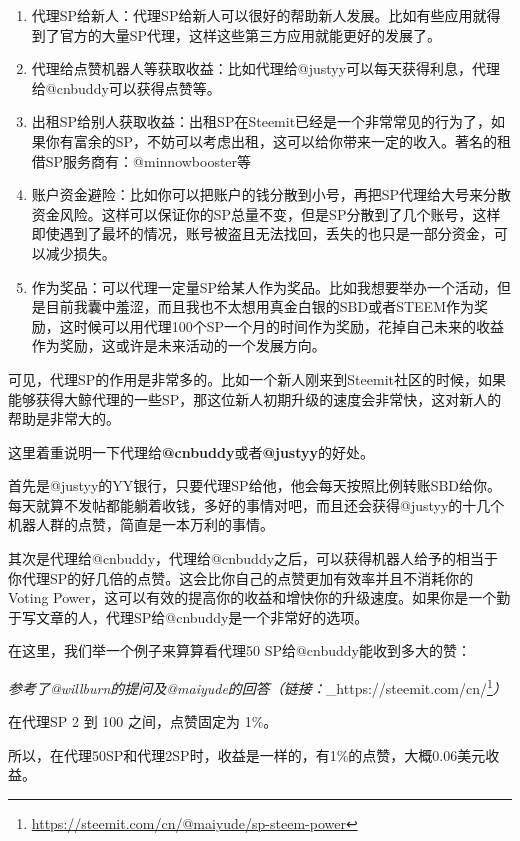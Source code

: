 \documentclass[]{ctexbook}
\providecommand{\tightlist}{%
  \setlength{\itemsep}{0pt}\setlength{\parskip}{0pt}}
\renewcommand{\href}[2]{#2\footnote{\url{#1}}}
\begin{document}
\begin{enumerate}
\def\labelenumi{\arabic{enumi}.}
\tightlist
\item
  代理SP给新人：代理SP给新人可以很好的帮助新人发展。比如有些应用就得到了官方的大量SP代理，这样这些第三方应用就能更好的发展了。
\item
  代理给点赞机器人等获取收益：比如代理给@justyy可以每天获得利息，代理给@cnbuddy可以获得点赞等。
\item
  出租SP给别人获取收益：出租SP在Steemit已经是一个非常常见的行为了，如果你有富余的SP，不妨可以考虑出租，这可以给你带来一定的收入。著名的租借SP服务商有：@minnowbooster等
\item
  账户资金避险：比如你可以把账户的钱分散到小号，再把SP代理给大号来分散资金风险。这样可以保证你的SP总量不变，但是SP分散到了几个账号，这样即使遇到了最坏的情况，账号被盗且无法找回，丢失的也只是一部分资金，可以减少损失。
\item
  作为奖品：可以代理一定量SP给某人作为奖品。比如我想要举办一个活动，但是目前我囊中羞涩，而且我也不太想用真金白银的SBD或者STEEM作为奖励，这时候可以用代理100个SP一个月的时间作为奖励，花掉自己未来的收益作为奖励，这或许是未来活动的一个发展方向。
\end{enumerate}

可见，代理SP的作用是非常多的。比如一个新人刚来到Steemit社区的时候，如果能够获得大鲸代理的一些SP，那这位新人初期升级的速度会非常快，这对新人的帮助是非常大的。

这里着重说明一下代理给\textbf{@cnbuddy}或者\textbf{@justyy}的好处。

首先是@justyy的YY银行，只要代理SP给他，他会每天按照比例转账SBD给你。每天就算不发帖都能躺着收钱，多好的事情对吧，而且还会获得@justyy的十几个机器人群的点赞，简直是一本万利的事情。

其次是代理给@cnbuddy，代理给@cnbuddy之后，可以获得机器人给予的相当于你代理SP的好几倍的点赞。这会比你自己的点赞更加有效率并且不消耗你的Voting Power，这可以有效的提高你的收益和增快你的升级速度。如果你是一个勤于写文章的人，代理SP给@cnbuddy是一个非常好的选项。

在这里，我们举一个例子来算算看代理50 SP给@cnbuddy能收到多大的赞：

\emph{参考了@willburn的提问及@maiyude的回答（链接：}\href{https://steemit.com/cn/@maiyude/sp-steem-power}{\_https://steemit.com/cn/\citet{maiyude/sp-steem-power_}}\emph{）}

在代理SP 2 到 100 之间，点赞固定为 1\%。

所以，在代理50SP和代理2SP时，收益是一样的，有1\%的点赞，大概0.06美元收益。
\end{document}
